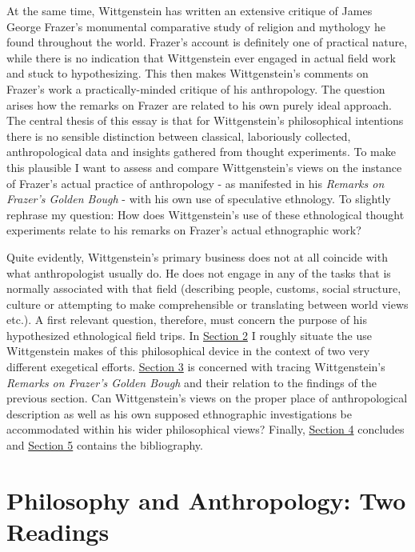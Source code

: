 \documentclass{article}
\begin{document}
At the same time, Wittgenstein has written an extensive critique of James George Frazer's monumental comparative study of religion and mythology he found throughout the world. Frazer's account is definitely one of practical nature, while there is no indication that Wittgenstein ever engaged in actual field work and stuck to hypothesizing. This then makes Wittgenstein's comments on Frazer's work a practically-minded critique of his anthropology. The question arises how the remarks on Frazer are related to his own purely ideal approach. The central thesis of this essay is that for Wittgenstein's philosophical intentions there is no sensible distinction between classical, laboriously collected, anthropological data and insights gathered from thought experiments. To make this plausible I want to assess and compare Wittgenstein's views on the instance of Frazer's actual practice of anthropology - as manifested in his \textit{Remarks on Frazer's Golden Bough} - with his own use of speculative ethnology. To slightly rephrase my question: How does Wittgenstein’s use of these ethnological thought experiments relate to his remarks on Frazer’s actual ethnographic work?

Quite evidently, Wittgenstein's primary business does not at all coincide with what anthropologist usually do. He does not engage in any of the tasks that is normally associated with that field (describing people, customs, social structure, culture or attempting to make comprehensible or translating between world views etc.). A first relevant question, therefore, must concern the purpose of his hypothesized ethnological field trips. In \hyperlink{sec2}{Section 2} I roughly situate the use Wittgenstein makes of this philosophical device in the context of two very different exegetical efforts.
\hyperlink{sec3}{Section 3} is concerned with tracing Wittgenstein's \textit{Remarks on Frazer's Golden Bough} and their relation to the findings of the previous section. Can Wittgenstein’s views on the proper place of anthropological description as well as his own supposed ethnographic investigations be accommodated within his wider philosophical views? Finally, \hyperlink{sec4}{Section 4} concludes and \hyperlink{sec5}{Section 5} contains the bibliography.

\section{Philosophy and Anthropology: Two Readings} %
\end{document}
